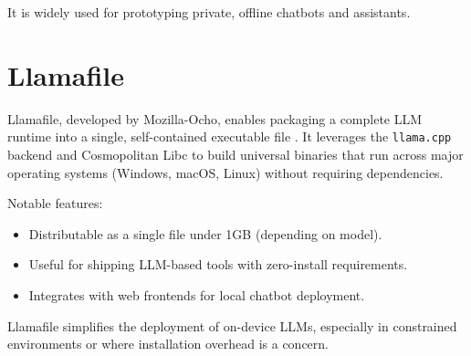 It is widely used for prototyping private, offline chatbots and assistants.

\section{Llamafile}

Llamafile, developed by Mozilla-Ocho, enables packaging a complete LLM runtime into a single, self-contained executable file \cite{llamafile}. It leverages the \texttt{llama.cpp} backend and Cosmopolitan Libc to build universal binaries that run across major operating systems (Windows, macOS, Linux) without requiring dependencies.

Notable features:
\begin{itemize}
    \item Distributable as a single file under 1GB (depending on model).
    \item Useful for shipping LLM-based tools with zero-install requirements.
    \item Integrates with web frontends for local chatbot deployment.
\end{itemize}

Llamafile simplifies the deployment of on-device LLMs, especially in constrained environments or where installation overhead is a concern.
